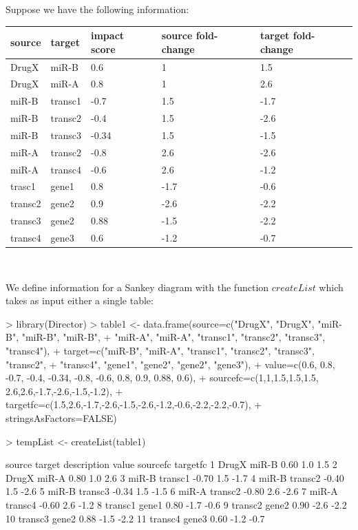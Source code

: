 \documentclass[a4paper]{article}
\begin{document}
\noindent Suppose we have the following information:\\
\begin{center}
    \begin{tabular}{lllll} \hline
    source & target & impact score & source fold-change & target fold-change\\ \hline
    DrugX & miR-B & 0.6 & 1 & 1.5\\
    DrugX & miR-A & 0.8 & 1 & 2.6\\
    miR-B & transc1 & -0.7 & 1.5 & -1.7\\
    miR-B & transc2 & -0.4 & 1.5 & -2.6\\
    miR-B & transc3 & -0.34 & 1.5 & -1.5\\
    miR-A & transc2 & -0.8 & 2.6 & -2.6\\
    miR-A & transc4 & -0.6 & 2.6 & -1.2\\
    trasc1 & gene1 & 0.8 & -1.7 & -0.6\\
    transc2 & gene2 & 0.9 & -2.6 & -2.2\\
    transc3 & gene2 & 0.88 & -1.5 & -2.2\\
    transc4 & gene3 & 0.6 & -1.2 & -0.7\\ \hline
    \end{tabular}\\
\end{center}

\noindent We define information for a Sankey diagram with the function $createList$ which takes as input either a single table:
\begin{Schunk}
\begin{Sinput}
> library(Director)
> table1 <- data.frame(source=c("DrugX", "DrugX", "miR-B", "miR-B", "miR-B",
+         "miR-A", "miR-A", "transc1", "transc2", "transc3", "transc4"),
+     target=c("miR-B", "miR-A", "transc1", "transc2", "transc3", "transc2",
+         "transc4", "gene1", "gene2", "gene2", "gene3"),
+     value=c(0.6, 0.8, -0.7, -0.4, -0.34, -0.8, -0.6, 0.8, 0.9, 0.88, 0.6),
+     sourcefc=c(1,1,1.5,1.5,1.5, 2.6,2.6,-1.7,-2.6,-1.5,-1.2),
+     targetfc=c(1.5,2.6,-1.7,-2.6,-1.5,-2.6,-1.2,-0.6,-2.2,-2.2,-0.7),
+     stringsAsFactors=FALSE)
\end{Sinput}
\end{Schunk}
\begin{Schunk}
\begin{Sinput}
> tempList <- createList(table1)
\end{Sinput}
\begin{Soutput}
    source  target description value sourcefc targetfc
1    DrugX   miR-B              0.60      1.0      1.5
2    DrugX   miR-A              0.80      1.0      2.6
3    miR-B transc1             -0.70      1.5     -1.7
4    miR-B transc2             -0.40      1.5     -2.6
5    miR-B transc3             -0.34      1.5     -1.5
6    miR-A transc2             -0.80      2.6     -2.6
7    miR-A transc4             -0.60      2.6     -1.2
8  transc1   gene1              0.80     -1.7     -0.6
9  transc2   gene2              0.90     -2.6     -2.2
10 transc3   gene2              0.88     -1.5     -2.2
11 transc4   gene3              0.60     -1.2     -0.7
\end{Soutput}
\end{Schunk}
\end{document}
